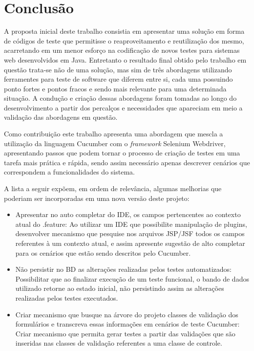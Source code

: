 \documentclass[tg]{mdtufsm}
\begin{document}
\chapter{Conclusão}
A proposta inicial deste trabalho consistia em apresentar uma solução em forma de códigos de teste que permitisse o reaproveitamento e reutilização dos mesmo, acarretando em um menor esforço na codificação de novos testes para sistemas web desenvolvidos em Java. Entretanto o resultado final obtido pelo trabalho em questão trata-se não de uma solução, mas sim de três abordagens utilizando ferramentes para teste de software que diferem entre si, cada uma possuindo ponto fortes e pontos fracos e sendo mais relevante para uma determinada situação. A condução e criação dessas abordagens foram tomadas ao longo do desenvolvimento a partir dos percalços e necessidades que apareciam em meio a validação das abordagens em questão.

Como contribuição este trabalho apresenta uma abordagem que mescla a utilização da linguagem Cucumber com o \emph{framework} Selenium Webdriver, apresentando passos que podem tornar o processo de criação de testes em uma tarefa mais prática e rápida, sendo assim necessário apenas descrever cenários que correspondem a funcionalidades do sistema.

A lista a seguir expõem, em ordem de relevância, algumas melhorias que poderiam ser incorporadas em uma nova versão deste projeto:

\begin{itemize}
	\item Apresentar no auto completar do IDE, os campos pertencentes ao contexto atual do .feature: Ao utilizar um IDE que possibilite manipulação de plugins, desenvolver mecanismo que pesquise nos arquivos JSP/JSF todos os campos referentes à um contexto atual, e assim apresente sugestão de alto completar para os cenários que estão sendo descritos pelo Cucumber.
	\item Não persistir no BD as alterações realizadas pelos testes automatizados: Possibilitar que ao finalizar execução de um teste funcional, o bando de dados utilizado retorne ao estado inicial, não persistindo assim as alterações realizadas pelos testes executados.
	\item Criar mecanismo que busque na árvore do projeto classes de validação dos formulários e transcreva essas informações em cenários de teste Cucumber: Criar mecanismo que permita gerar testes a partir das validações que são inseridas nas classes de validação referentes a uma classe de controle.
\end{itemize}

\setlength{\baselineskip}{\baselineskip}


\end{document}
